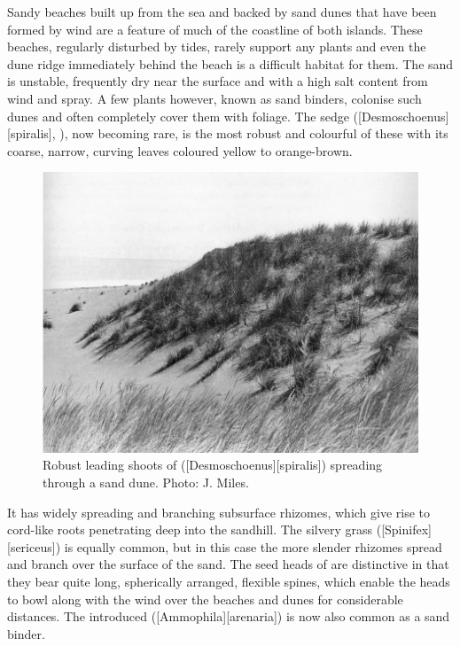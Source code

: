 Sandy beaches built up from the sea and backed by sand dunes that have been formed by wind are a feature of much of the coastline of both islands.
These beaches, regularly disturbed by tides, rarely support any plants and even the dune ridge immediately behind the beach is a difficult habitat for them.
The sand is unstable, frequently dry near the surface and with a high salt content from wind and spray.
A few plants however, known as sand binders, colonise such dunes and often completely cover them with foliage.
The sedge  ([Desmoschoenus][spiralis], ), now becoming rare, is the most robust and colourful of these with its coarse, narrow, curving leaves coloured yellow to orange-brown.
\begin{figure}[t]
	\includegraphics[width=\textwidth]{graphics/fig_088}
	\centering
	\caption[Robust leading shoots of pingao]{Robust leading shoots of  ([Desmoschoenus][spiralis]) spreading through a sand dune.
	Photo: J. Miles.}%
	\label{fig:88pingao}
\end{figure}
It has widely spreading and branching subsurface rhizomes, which give rise to cord-like roots penetrating deep into the sandhill.
The silvery grass  ([Spinifex][sericeus]) is equally common, but in this case the more slender rhizomes spread and branch over the surface of the sand.
The seed heads of  are distinctive in that they bear quite long, spherically arranged, flexible spines, which enable the heads to bowl along with the wind over the beaches and dunes for considerable distances.
The introduced  ([Ammophila][arenaria]) is now also common as a sand binder.

